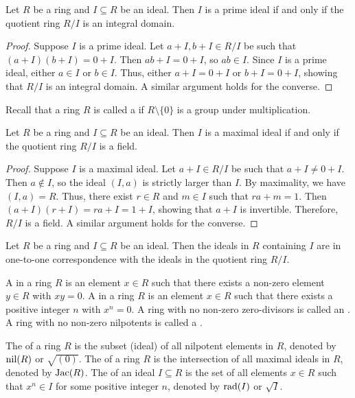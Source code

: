 \begin{proposition}
    Let $R$ be a ring and $I \subseteq R$ be an ideal. Then $I$ is a prime ideal if and only if the quotient ring $R/I$ is an integral domain.
\end{proposition}
\begin{proof}
    Suppose $I$ is a prime ideal. Let $a + I, b + I \in R/I$ be such that $(a + I)(b + I) = 0 + I$. Then $ab + I = 0 + I$, so $ab \in I$. Since $I$ is a prime ideal, either $a \in I$ or $b \in I$. Thus, either $a + I = 0 + I$ or $b + I = 0 + I$, showing that $R/I$ is an integral domain. A similar argument holds for the converse.
\end{proof}

Recall that a ring $R$ is called a  if $R \setminus \{0\}$ is a group under multiplication. 

\begin{proposition}
    Let $R$ be a ring and $I \subseteq R$ be an ideal. Then $I$ is a maximal ideal if and only if the quotient ring $R/I$ is a field.
\end{proposition}
\begin{proof}
    Suppose $I$ is a maximal ideal. Let $a + I \in R/I$ be such that $a + I \neq 0 + I$. Then $a \notin I$, so the ideal $(I, a)$ is strictly larger than $I$. By maximality, we have $(I, a) = R$. Thus, there exist $r \in R$ and $m \in I$ such that $ra + m = 1$. Then $(a + I)(r + I) = ra + I = 1 + I$, showing that $a + I$ is invertible. Therefore, $R/I$ is a field. A similar argument holds for the converse.
\end{proof}

\begin{proposition}
    Let $R$ be a ring and $I \subseteq R$ be an ideal. Then the ideals in $R$ containing $I$ are in one-to-one correspondence with the ideals in the quotient ring $R/I$.
\end{proposition}

A  in a ring $R$ is an element $x \in R$ such that there exists a non-zero element $y \in R$ with $xy = 0$. A  in a ring $R$ is an element $x \in R$ such that there exists a positive integer $n$ with $x^n = 0$. A ring with no non-zero zero-divisors is called an . A ring with no non-zero nilpotents is called a .

The  of a ring $R$ is the subset (ideal) of all nilpotent elements in $R$, denoted by $\operatorname{nil}(R)$ or $\sqrt{(0)}$. The  of a ring $R$ is the intersection of all maximal ideals in $R$, denoted by $\operatorname{Jac}(R)$. The  of an ideal $I \subseteq R$ is the set of all elements $x \in R$ such that $x^n \in I$ for some positive integer $n$, denoted by $\operatorname{rad}(I)$ or $\sqrt{I}$.

